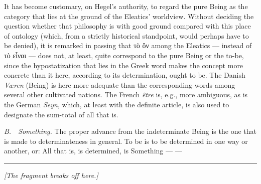 \documentclass[12pt]{article}
\newcommand{\opage}[1]{\marginnote{\footnotesize\textit{[#1]}}}
\begin{document}
It has become customary, on Hegel's authority, to regard the pure Being as the category
that lies at the ground of the Eleatics' worldview. Without deciding the question whether
that philosophy is with good ground compared with this place of ontology (which, from a
strictly historical standpoint, would perhaps have to be denied), it is remarked in
passing that τὸ ὄν among the Eleatics --- instead of τὸ εἶναι --- does not, at least, quite
correspond to the pure Being or the to-be, since the hypostatization that lies in the
Greek word makes the concept more concrete than it here, according to its determination,
ought to be. The Danish \emph{Væren} (Being) is here more adequate than the corresponding
words among several \opage{212}other cultivated nations. The French \textit{être} is,
e.g., more ambiguous, as is the German \emph{Seyn}, which, at least with the definite
article, is also used to designate the sum-total of all that is.

\emph{B.}~~\emph{Something.} The proper advance from the indeterminate Being is the one
that is made to determinateness in general. To be is to be determined in one way or
another, or: All that is, is determined, is Something --- ---

\begin{center}\rule{0.32\textwidth}{0.4pt}\end{center}

\medskip
\begin{center}\footnotesize\textit{[The fragment breaks off here.]}\end{center}
\end{document}
